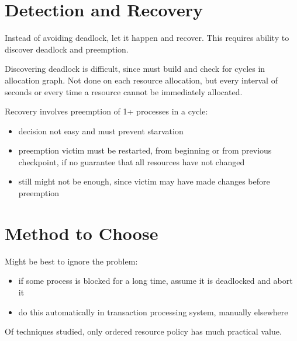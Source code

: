 \documentclass[11pt]{article}
\begin{document}
\section{Detection and Recovery}
\label{sec:org5a6f8eb}
Instead of avoiding deadlock, let it happen and recover.
This requires ability to discover deadlock and preemption.

Discovering deadlock is difficult, since must build and check for cycles in allocation graph.
Not done on each resource allocation, but every interval of seconds or every time a resource cannot
be immediately allocated.

Recovery involves preemption of 1+ processes in a cycle:
\begin{itemize}
\item decision not easy and must prevent starvation
\item preemption victim must be restarted, from beginning or from previous checkpoint, if no guarantee that
all resources have not changed
\item still might not be enough, since victim may have made changes before preemption
\end{itemize}
\section{Method to Choose}
\label{sec:orge825e17}
Might be best to ignore the problem:
\begin{itemize}
\item if some process is blocked for a long time, assume it is deadlocked and abort it
\item do this automatically in transaction processing system, manually elsewhere
\end{itemize}

Of techniques studied, only ordered resource policy has much practical value.
\end{document}
